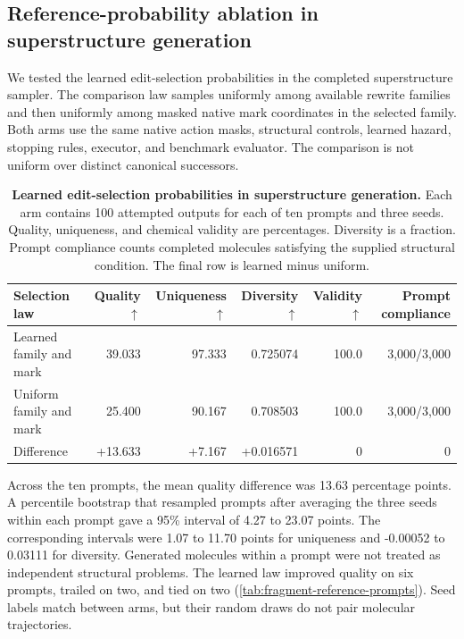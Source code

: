 \subsection{Reference-probability ablation in superstructure generation}
\label{app:fragment-reference-ablation}

We tested the learned edit-selection probabilities in the completed
superstructure sampler. The comparison law samples uniformly among available
rewrite families and then uniformly among masked native mark coordinates in
the selected family. Both arms use the same native action masks, structural
controls, learned hazard, stopping rules, executor, and benchmark evaluator.
The comparison is not uniform over distinct canonical successors.

\begin{table}[t]
\centering
\small
\caption{\small\textbf{Learned edit-selection probabilities in superstructure generation.}
Each arm contains 100 attempted outputs for each of ten prompts and three
seeds. Quality, uniqueness, and chemical validity are percentages. Diversity
is a fraction. Prompt compliance counts completed molecules satisfying the
supplied structural condition. The final row is learned minus uniform.}
\label{tab:fragment-reference-superstructure}
\begin{tabular}{@{}lrrrrr@{}}
\toprule
Selection law & Quality $\uparrow$ & Uniqueness $\uparrow$ & Diversity $\uparrow$ & Validity $\uparrow$ & Prompt compliance \\
\midrule
Learned family and mark & 39.033 & 97.333 & 0.725074 & 100.0 & 3,000/3,000 \\
Uniform family and mark & 25.400 & 90.167 & 0.708503 & 100.0 & 3,000/3,000 \\
Difference & +13.633 & +7.167 & +0.016571 & 0 & 0 \\
\bottomrule
\end{tabular}
\end{table}

Across the ten prompts, the mean quality difference was 13.63 percentage
points. A percentile bootstrap that resampled prompts after averaging the
three seeds within each prompt gave a 95\% interval of 4.27 to 23.07 points.
The corresponding intervals were 1.07 to 11.70 points for uniqueness and
-0.00052 to 0.03111 for diversity. Generated molecules within a prompt were
not treated as independent structural problems. The learned law improved
quality on six prompts, trailed on two, and tied on two
(\cref{tab:fragment-reference-prompts}). Seed labels match between arms,
but their random draws do not pair molecular trajectories.


